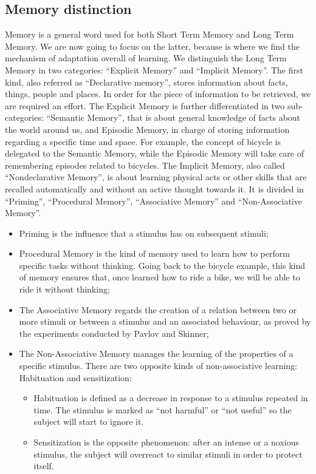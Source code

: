 \documentclass[conference]{IEEEtran}
\begin{document}
	\subsection{Memory distinction}\label{MD}
		Memory is a general word used for both Short Term Memory and Long Term Memory. We are now going to focus on the latter, because is where we find the mechanism of adaptation overall of learning.
		We distinguish the Long Term Memory in two categories: ``Explicit Memory'' and ``Implicit Memory''.
		The first kind, also referred as ``Declarative memory'',  stores information about facts, things, people and places. In order for the piece of information to be retrieved, we are required an effort.
		The Explicit Memory is further differentiated in two sub-categories: ``Semantic Memory'', that is about general knowledge of facts about the world around us, and Episodic Memory, in charge of storing information regarding a specific time and space.
		For example, the concept of bicycle is delegated to the Semantic Memory, while the Episodic Memory will take care of remembering episodes related to bicycles.
		The Implicit Memory, also called ``Nondeclarative Memory'', is about learning physical acts or other skills that are recalled automatically and without an active thought towards it.
		It is divided in ``Priming'', ``Procedural Memory'', ``Associative Memory'' and ``Non-Associative Memory''.
		\begin{itemize}
			\item Priming is the influence that a stimulus has on subsequent stimuli;
			\item Procedural Memory is the kind of memory used to learn how to perform specific tasks without thinking. Going back to the bicycle example, this kind of memory ensures that, once learned how to ride a bike, we will be able to ride it without thinking;
			\item The Associative Memory regards the creation of a relation between two or more stimuli or between a stimulus and an associated behaviour, as proved by the experiments conducted by Pavlov and Skinner;
			\item The Non-Associative Memory manages the learning of the properties of a specific stimulus. There are two opposite kinds of non-associative learning: Habituation and sensitization:
			\begin{itemize}
				\item Habituation is defined as a decrease in response to a stimulus repeated in time. The stimulus is marked as ``not harmful'' or ``not useful'' so the subject will start to ignore it.
				\item Sensitization is the opposite phenomenon: after an intense or a noxious stimulus, the subject will overreact to similar stimuli in order to protect itself.
			\end{itemize}
		\end{itemize}
\end{document}
